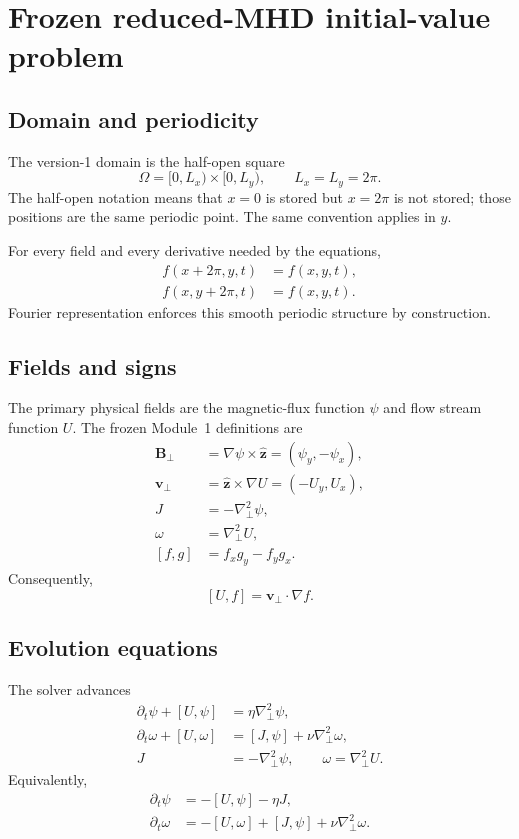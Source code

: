 \documentclass[11pt]{article}
\newcommand{\pd}{\partial}
\newcommand{\vect}[1]{\bm{#1}}
\newcommand{\bracket}[2]{\left[#1,#2\right]}
\newcommand{\Lap}{\nabla_{\!\perp}^{2}}
\begin{document}
\section{Frozen reduced-MHD initial-value problem}
\label{sec:ivp}

\subsection{Domain and periodicity}

The version-1 domain is the half-open square
\begin{equation}
\Omega=[0,L_x)\times[0,L_y),
\qquad L_x=L_y=2\pi.
\label{eq:domain}
\end{equation}
The half-open notation means that $x=0$ is stored but $x=2\pi$ is not stored; those positions are the same periodic point. The same convention applies in $y$.

For every field and every derivative needed by the equations,
\begin{align}
f(x+2\pi,y,t)&=f(x,y,t),\\
f(x,y+2\pi,t)&=f(x,y,t).
\end{align}
Fourier representation enforces this smooth periodic structure by construction.

\subsection{Fields and signs}

The primary physical fields are the magnetic-flux function $\psi$ and flow stream function $U$. The frozen Module~1 definitions are
\begin{align}
\vect{B}_{\perp}
&=\nabla\psi\times\widehat{\vect{z}}
=(\psi_y,-\psi_x),\\
\vect{v}_{\perp}
&=\widehat{\vect{z}}\times\nabla U
=(-U_y,U_x),\\
J&=-\Lap\psi,\\
\omega&=\Lap U,\\
\bracket{f}{g}
&=f_xg_y-f_yg_x.
\end{align}
Consequently,
\begin{equation}
\bracket{U}{f}=\vect{v}_{\perp}\cdot\nabla f.
\end{equation}

\subsection{Evolution equations}

The solver advances
\begin{align}
\pd_t\psi+\bracket{U}{\psi}
&=\eta\Lap\psi,
\label{eq:psi}\\
\pd_t\omega+\bracket{U}{\omega}
&=\bracket{J}{\psi}+\nu\Lap\omega,
\label{eq:omega}\\
J&=-\Lap\psi,
\qquad
\omega=\Lap U.
\label{eq:definitions}
\end{align}
Equivalently,
\begin{align}
\pd_t\psi
&=-\bracket{U}{\psi}-\eta J,\\
\pd_t\omega
&=-\bracket{U}{\omega}+\bracket{J}{\psi}+\nu\Lap\omega.
\end{align}
\end{document}
